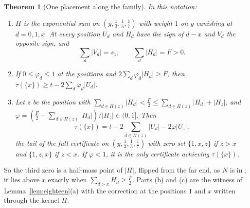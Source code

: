\documentclass[11pt]{article}
\newtheorem{theorem}{Theorem}[section]
\begin{document}
\begin{theorem}[One placement along the family]\label{thm:familyzero}
In this notation:
\begin{enumerate}
\item[(a)] $H$ is the exponential sum on $(y,\tfrac13,\tfrac15,\tfrac17)$
with weight $1$ on $y$ vanishing at $d=0,1,x$.  At every position $U_d$ and
$H_d$ have the sign of $d-x$ and $V_d$ the opposite sign, and
\[
  \sum_d|V_d|=s_1,\qquad\sum_d|H_d|=F>0 .
\]
\item[(b)] If $0\le\varphi_d\le1$ at the positions and
$2\sum_d\varphi_d|H_d|\ge F$, then $\tau(\{x\})\ge t-2\sum_d\varphi_d|U_d|$.
\item[(c)] Let $z$ be the position with
$\sum_{d\in\Pi(z)}|H_d|<\tfrac F2\le\sum_{d\in\Pi(z)}|H_d|+|H_z|$, and
$\varphi=(\tfrac F2-\sum_{d\in\Pi(z)}|H_d|)/|H_z|\in(0,1]$.  Then
\[
  \tau(\{x\})=t-2\sum_{d\in\Pi(z)}|U_d|-2\varphi|U_z|,
\]
the tail of the full certificate on $(y,\tfrac13,\tfrac15,\tfrac17)$ with
zero set $\{1,x,z\}$ if $z>x$ and $\{1,z,x\}$ if $z<x$.  If $\varphi<1$, it is
the only certificate achieving $\tau(\{x\})$.
\end{enumerate}
\end{theorem}

So the third zero is a half-mass point of $|H|$, flipped from the far end,
as $N$ is in \cite[Theorem~5.3(c)]{coefficient-mass-attainment}; it lies above $x$ exactly when
$\sum_{d>x}H_d\ge\tfrac F2$.  Parts (b) and (c) are the witness of
Lemma~\ref{lem:eighteen}(a) with the correction at the positions $1$ and
$x$ written through the kernel $H$.
\end{document}
